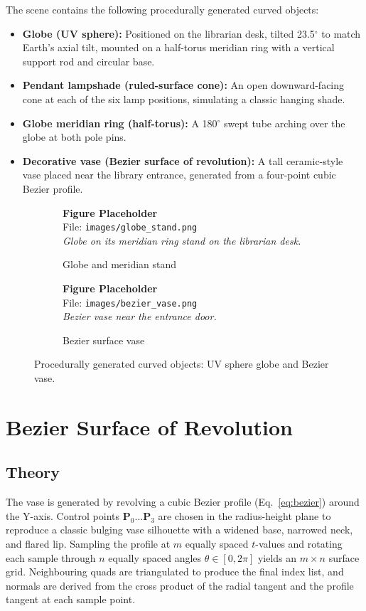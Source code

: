 \documentclass[12pt, a4paper]{article}
\newcommand{\imgph}[2]{%
    \begin{mdframed}[backgroundcolor=lightblue!60, linecolor=sectionblue,
                     linewidth=1pt, roundcorner=4pt, innertopmargin=8pt,
                     innerbottommargin=8pt]
        \centering
        {\bfseries\color{sectionblue} Figure Placeholder}\\[4pt]
        File: \texttt{#1}\\[3pt]
        {\small\itshape #2}
    \end{mdframed}%
}
\begin{document}
The scene contains the following procedurally generated curved objects:

\begin{itemize}[leftmargin=1.5em]
    \item \textbf{Globe (UV sphere):} Positioned on the librarian desk, tilted 23.5$^\circ$ to match Earth's axial tilt, mounted on a half-torus meridian ring with a vertical support rod and circular base.
    \item \textbf{Pendant lampshade (ruled-surface cone):} An open downward-facing cone at each of the six lamp positions, simulating a classic hanging shade.
    \item \textbf{Globe meridian ring (half-torus):} A 180$^\circ$ swept tube arching over the globe at both pole pins.
    \item \textbf{Decorative vase (Bezier surface of revolution):} A tall ceramic-style vase placed near the library entrance, generated from a four-point cubic Bezier profile.
\end{itemize}

\begin{figure}[H]
    \centering
    \begin{subfigure}{0.47\textwidth}
        \imgph{images/globe_stand.png}{Globe on its meridian ring stand on the librarian desk.}
        \caption{Globe and meridian stand}
    \end{subfigure}\hfill
    \begin{subfigure}{0.47\textwidth}
        \imgph{images/bezier_vase.png}{Bezier vase near the entrance door.}
        \caption{Bezier surface vase}
    \end{subfigure}
    \caption{Procedurally generated curved objects: UV sphere globe and Bezier vase.}
    \label{fig:curvedobjects}
\end{figure}

\section{Bezier Surface of Revolution}

\subsection{Theory}

The vase is generated by revolving a cubic Bezier profile (Eq.~\ref{eq:bezier}) around the Y-axis. Control points $\mathbf{P}_0\dots\mathbf{P}_3$ are chosen in the radius-height plane to reproduce a classic bulging vase silhouette with a widened base, narrowed neck, and flared lip. Sampling the profile at $m$ equally spaced $t$-values and rotating each sample through $n$ equally spaced angles $\theta\in[0,2\pi]$ yields an $m{\times}n$ surface grid. Neighbouring quads are triangulated to produce the final index list, and normals are derived from the cross product of the radial tangent and the profile tangent at each sample point.
\end{document}
